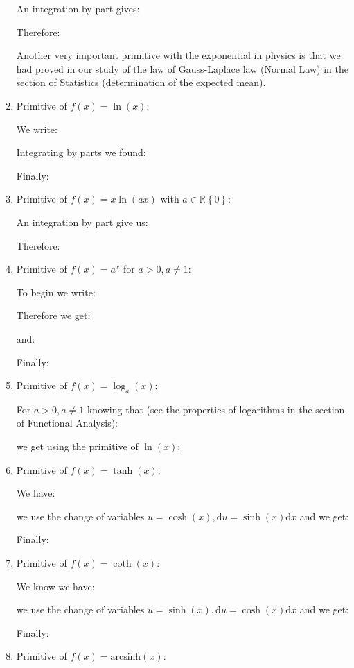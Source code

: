 \begin{enumerate}
		An integration by part gives:
		
		Therefore:
		
		\begin{tcolorbox}[title=Remark,colframe=black,arc=10pt]
		Another very important primitive with the exponential in physics is that we had proved in our study of the law of Gauss-Laplace law (Normal Law) in the section of Statistics (determination of the expected mean).
		\end{tcolorbox}
		\item Primitive of $f(x)=\ln(x)$:
		
		We write:
		
		Integrating by parts we found:
		
		Finally:
		
		\item Primitive of $f(x)=x\ln(ax)$ with $a\in \mathbb{R}\left\lbrace 0 \right\rbrace$:
		
		An integration by part give us:
		
		Therefore:
		
		\item Primitive of $f(x)=a^x$ for $a>0,a\neq 1$:
		
		To begin we write:
		
		Therefore we get:
		
		and:
		
		Finally:
		
		\item Primitive of $f(x)=\log_a(x)$:
		
		For $a>0,a\neq 1$ knowing that (see the properties of logarithms in the section of Functional Analysis):
		
		we get using the primitive of $\ln(x)$:
		
		\item Primitive of $f(x)=\tanh(x)$:
		
		We have:
		
		we use the change of variables $u=\cosh(x),\mathrm{d}u=\sinh(x)\mathrm{d}x$ and we get:
		
		Finally:
		
		\item Primitive of $f(x)=\coth(x)$:
		
		We know we have:
		
		we use the change of variables $u=\sinh(x),\mathrm{d}u=\cosh(x)\mathrm{d}x$ and we get:
		
		Finally:
		
		\item Primitive of $f(x)=\text{arcsinh}(x)$:
		

\end{enumerate}
